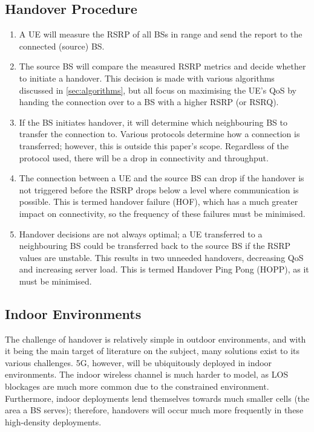 \subsection{Handover Procedure}
\begin{enumerate}
    \item A UE will measure the RSRP of all BSs in range and send the report to the connected (source) BS.
    \item The source BS will compare the measured RSRP metrics and decide whether to initiate a handover. This decision is made with various algorithms discussed in \ref{sec:algorithms}, but all focus on maximising the UE's QoS by handing the connection over to a BS with a higher RSRP (or RSRQ).
    \item If the BS initiates handover, it will determine which neighbouring BS to transfer the connection to. Various protocols determine how a connection is transferred; however, this is outside this paper's scope. Regardless of the protocol used, there will be a drop in connectivity and throughput.
    \item The connection between a UE and the source BS can drop if the handover is not triggered before the RSRP drops below a level where communication is possible. This is termed handover failure (HOF), which has a much greater impact on connectivity, so the frequency of these failures must be minimised.
    \item Handover decisions are not always optimal; a UE transferred to a neighbouring BS could be transferred back to the source BS if the RSRP values are unstable. This results in two unneeded handovers, decreasing QoS and increasing server load. This is termed Handover Ping Pong (HOPP), as it must be minimised.
\end{enumerate}

\subsection{Indoor Environments}
The challenge of handover is relatively simple in outdoor environments, and with it being the main target of literature on the subject, many solutions exist to its various challenges. 5G, however, will be ubiquitously deployed in indoor environments. The indoor wireless channel is much harder to model, as LOS blockages are much more common due to the constrained environment. Furthermore, indoor deployments lend themselves towards much smaller cells (the area a BS serves); therefore, handovers will occur much more frequently in these high-density deployments.

